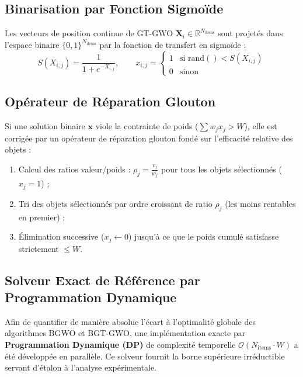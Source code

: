 \subsection{Binarisation par Fonction Sigmoïde}
Les vecteurs de position continue de GT-GWO $\mathbf{X}_i \in \mathbb{R}^{N_{\text{items}}}$ sont projetés dans l'espace binaire $\{0, 1\}^{N_{\text{items}}}$ par la fonction de transfert en sigmoïde :
\begin{equation}
    S(X_{i,j}) = \frac{1}{1 + e^{-X_{i,j}}}, \qquad
    x_{i,j} = 
    \begin{cases}
        1 & \text{si } \text{rand}() < S(X_{i,j}) \\
        0 & \text{sinon}
    \end{cases}
\end{equation}

\subsection{Opérateur de Réparation Glouton}
Si une solution binaire $\mathbf{x}$ viole la contrainte de poids ($\sum w_j x_j > W$), elle est corrigée par un opérateur de réparation glouton fondé sur l'efficacité relative des objets :
\begin{enumerate}[label=\textbf{\arabic*.}]
    \item Calcul des ratios valeur/poids : $\rho_j = \frac{v_j}{w_j}$ pour tous les objets sélectionnés ($x_j = 1$) ;
    \item Tri des objets sélectionnés par ordre croissant de ratio $\rho_j$ (les moins rentables en premier) ;
    \item Élimination successive ($x_j \leftarrow 0$) jusqu'à ce que le poids cumulé satisfasse strictement $\le W$.
\end{enumerate}

\subsection{Solveur Exact de Référence par Programmation Dynamique}
Afin de quantifier de manière absolue l'écart à l'optimalité globale des algorithmes BGWO et BGT-GWO, une implémentation exacte par \textbf{Programmation Dynamique (DP)} de complexité temporelle $\mathcal{O}(N_{\text{items}} \cdot W)$ a été développée en parallèle. Ce solveur fournit la borne supérieure irréductible servant d'étalon à l'analyse expérimentale.
